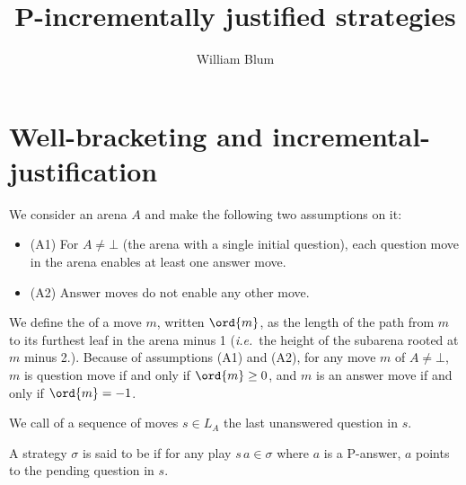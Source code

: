 
\newcommand{\subseqof}{\sqsubseteq}
\newcommand{\prefixof}{\leqslant}


\author{William Blum}
\title{P-incrementally justified strategies}


\maketitle 

\section{Well-bracketing and incremental-justification}

We consider an arena $A$ and make the following two assumptions on it:
\begin{itemize}
\item (A1) For $A \neq \bot$ (the arena with a single initial question), each question move in the arena enables at least one answer move.
\item (A2) Answer moves do not enable any other move.
\end{itemize}

We define the  of a move $m$, written $\ord{m}$, as
the length of the path from $m$ to its furthest leaf in the arena minus 1
({\it i.e.}~the height of the subarena rooted at $m$ minus 2.).
Because of assumptions (A1) and (A2),
for any move $m$ of $A \neq \bot$, $m$ is question move if and only if $\ord{m} \geq 0$, and $m$ is an answer move if and only if $\ord{m} = -1$.





We call  of a sequence of moves $s \in L_A$ the last unanswered question in $s$.

\begin{definition}\rm
A strategy $\sigma$ is said to be  if for any play $s \, a \in \sigma$ where $a$ is a  P-answer, $a$ points to the pending question in $s$.
\end{definition}



